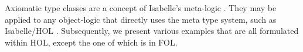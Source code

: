 Axiomatic type classes are a concept of Isabelle's meta-logic
\cite{paulson-isa-book,Wenzel:1997:TPHOL}.  They may be applied to any
object-logic that directly uses the meta type system, such as Isabelle/HOL
\cite{isabelle-HOL}.  Subsequently, we present various examples that are all
formulated within HOL, except the one of  which is in
FOL.



















